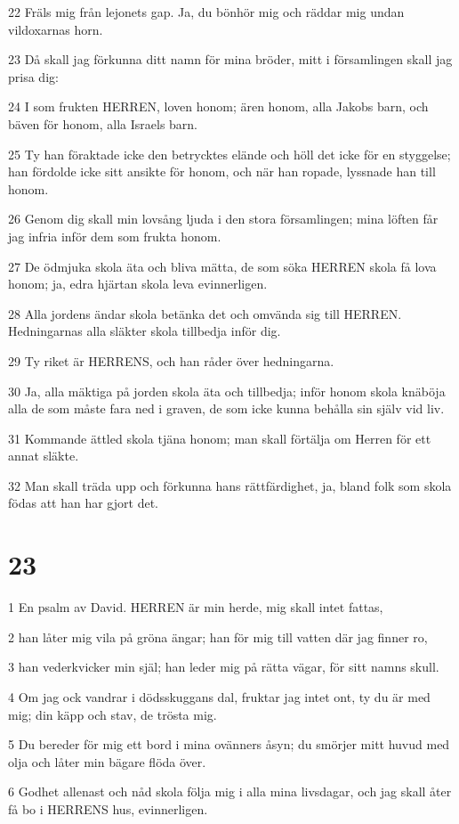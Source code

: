 \par 22 Fräls mig från lejonets gap. Ja, du bönhör mig och räddar mig undan vildoxarnas horn.
\par 23 Då skall jag förkunna ditt namn för mina bröder, mitt i församlingen skall jag prisa dig:
\par 24 I som frukten HERREN, loven honom; ären honom, alla Jakobs barn, och bäven för honom, alla Israels barn.
\par 25 Ty han föraktade icke den betrycktes elände och höll det icke för en styggelse; han fördolde icke sitt ansikte för honom, och när han ropade, lyssnade han till honom.
\par 26 Genom dig skall min lovsång ljuda i den stora församlingen; mina löften får jag infria inför dem som frukta honom.
\par 27 De ödmjuka skola äta och bliva mätta, de som söka HERREN skola få lova honom; ja, edra hjärtan skola leva evinnerligen.
\par 28 Alla jordens ändar skola betänka det och omvända sig till HERREN. Hedningarnas alla släkter skola tillbedja inför dig.
\par 29 Ty riket är HERRENS, och han råder över hedningarna.
\par 30 Ja, alla mäktiga på jorden skola äta och tillbedja; inför honom skola knäböja alla de som måste fara ned i graven, de som icke kunna behålla sin själv vid liv.
\par 31 Kommande ättled skola tjäna honom; man skall förtälja om Herren för ett annat släkte.
\par 32 Man skall träda upp och förkunna hans rättfärdighet, ja, bland folk som skola födas att han har gjort det.

\chapter{23}

\par 1 En psalm av David. HERREN är min herde, mig skall intet fattas,
\par 2 han låter mig vila på gröna ängar; han för mig till vatten där jag finner ro,
\par 3 han vederkvicker min själ; han leder mig på rätta vägar, för sitt namns skull.
\par 4 Om jag ock vandrar i dödsskuggans dal, fruktar jag intet ont, ty du är med mig; din käpp och stav, de trösta mig.
\par 5 Du bereder för mig ett bord i mina ovänners åsyn; du smörjer mitt huvud med olja och låter min bägare flöda över.
\par 6 Godhet allenast och nåd skola följa mig i alla mina livsdagar, och jag skall åter få bo i HERRENS hus, evinnerligen.

